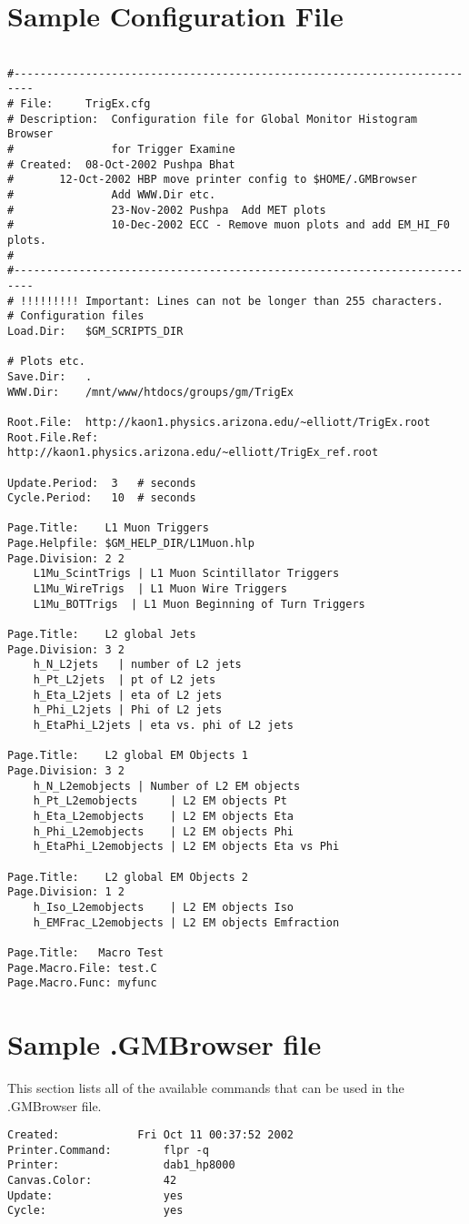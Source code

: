 \documentclass[12pt]{article}
\begin{document}
\section{Sample Configuration File}
\label{sec:config}
{
  \small
  \begin{verbatim}

#-------------------------------------------------------------------------
# File:		TrigEx.cfg
# Description:	Configuration file for Global Monitor Histogram Browser
#               for Trigger Examine
# Created:	08-Oct-2002 Pushpa Bhat
#		12-Oct-2002 HBP move printer config to $HOME/.GMBrowser
#				Add WWW.Dir etc.
#               23-Nov-2002 Pushpa  Add MET plots
#               10-Dec-2002 ECC - Remove muon plots and add EM_HI_F0 plots.
# 
#-------------------------------------------------------------------------
# !!!!!!!!! Important: Lines can not be longer than 255 characters.
# Configuration files
Load.Dir:	$GM_SCRIPTS_DIR

# Plots etc.
Save.Dir:	.
WWW.Dir:	/mnt/www/htdocs/groups/gm/TrigEx

Root.File:	http://kaon1.physics.arizona.edu/~elliott/TrigEx.root
Root.File.Ref:	http://kaon1.physics.arizona.edu/~elliott/TrigEx_ref.root 

Update.Period:	3	# seconds
Cycle.Period:	10	# seconds

Page.Title:    L1 Muon Triggers
Page.Helpfile: $GM_HELP_DIR/L1Muon.hlp
Page.Division: 2 2
	L1Mu_ScintTrigs	| L1 Muon Scintillator Triggers
	L1Mu_WireTrigs  | L1 Muon Wire Triggers
	L1Mu_BOTTrigs  | L1 Muon Beginning of Turn Triggers

Page.Title:    L2 global Jets
Page.Division: 3 2
	h_N_L2jets   | number of L2 jets
	h_Pt_L2jets  | pt of L2 jets
	h_Eta_L2jets | eta of L2 jets
	h_Phi_L2jets | Phi of L2 jets
	h_EtaPhi_L2jets | eta vs. phi of L2 jets

Page.Title:    L2 global EM Objects 1
Page.Division: 3 2
	h_N_L2emobjects | Number of L2 EM objects
	h_Pt_L2emobjects     | L2 EM objects Pt
	h_Eta_L2emobjects    | L2 EM objects Eta
	h_Phi_L2emobjects    | L2 EM objects Phi
	h_EtaPhi_L2emobjects | L2 EM objects Eta vs Phi

Page.Title:    L2 global EM Objects 2
Page.Division: 1 2
	h_Iso_L2emobjects    | L2 EM objects Iso
	h_EMFrac_L2emobjects | L2 EM objects Emfraction

Page.Title:   Macro Test
Page.Macro.File: test.C
Page.Macro.Func: myfunc

  \end{verbatim}
}
\section{Sample .GMBrowser file}
\label{sec:GMBrowser}
This section lists all of the available commands that can
be used in the .GMBrowser file.
{
  \small
  \begin{verbatim}
Created:	        Fri Oct 11 00:37:52 2002
Printer.Command:        flpr -q
Printer:                dab1_hp8000
Canvas.Color:           42
Update:                 yes
Cycle:                  yes
  \end{verbatim}
}
\end{document}
